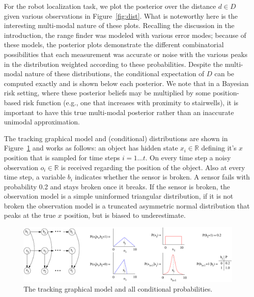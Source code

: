 \documentclass[letterpaper]{article}
\newcommand{\R}{\mathbb{R}}
\begin{document}
{For the {robot localization} task, we plot the posterior over
the distance $d \in D$ given various observations in Figure~\ref{fig:dist}.
What is noteworthy here is the interesting multi-modal
nature of these plots. Recalling the discussion in the introduction,
the range finder was modeled with various error modes; because of these
models, the posterior plots demonstrate the different combinatorial
possibilities that each measurement was accurate or noise with the various
peaks in the distribution weighted according to these probabilities.
Despite the multi-modal nature of these distributions, the conditional 
expectation of $D$ can be computed exactly and is shown below each posterior.
We note that in a Bayesian risk setting, where these posterior beliefs
may be multiplied by some position-based risk function (e.g., one
that increases with proximity to stairwells),
it is important to have this true multi-modal posterior rather than an 
inaccurate unimodal approximation.

The {tracking} graphical model and (conditional) distributions
are shown in Figure~\ref{fig:gm3}
and works as follows: an object has hidden state $x_i \in \R$ defining
it's $x$ position that is sampled for time steps $i = 1 \ldots t$.  On
every time step a noisy observation $o_i \in \R$ is received regarding
the position of the object.  Also at every time step, a variable $b_i$
indicates whether the sensor is broken.  A sensor fails with probability
0.2 and stays broken once it breaks.  If the sensor is broken, the
observation model is a simple uninformed triangular distribution, if
it is not broken the observation model is a truncated asymmetric
normal distribution that peaks at the true $x$ position, but is biased
to underestimate.

\begin{figure}[t!]
\begin{center}
\vspace{-1mm}
\includegraphics[width=.7\textwidth]{gm3.pdf}
\end{center}
\vspace{-6mm}
\caption{\footnotesize The {tracking} graphical model and all conditional probabilities.} \label{fig:gm3}
\end{figure}

}
\end{document}

